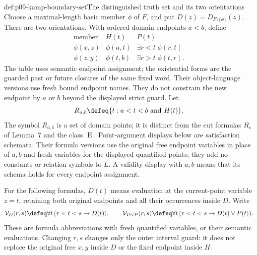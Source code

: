 \begin{hbdefinition}{def:p09-kamp-boundary-set}{The distinguished truth set and its two orientations}
Choose a maximal-length basic member \(\phi\) of \(F\), and
put \(D(z)=D_{F\setminus\{\phi\}}(z)\). There are two
orientations. With ordered domain endpoints \(a<b\), define
\[
\begin{array}{c|c|c}
 \text{member}&H(t)&P(t)\\ \hline
 \phi(x,z)&\phi(a,t)&\exists r<t\;\phi(r,t)\\
 \phi(z,y)&\phi(t,b)&\exists r>t\;\phi(t,r).
\end{array}
\]
The table uses semantic endpoint assignment; the existential forms are
the guarded past or future closures of the same fixed word. Their
object-language versions use fresh bound endpoint names. They do not
constrain the new endpoint by \(a\) or \(b\) beyond the displayed
strict guard. Let
\[
                   R_{a,b}\defeq\{t:a<t<b\text{ and }H(t)\}.
\]
The symbol \(R_{a,b}\) is a set of domain points; it is distinct
from the cut formulas \(R_c\) of Lemma~7 and the class
\(\operatorname{E}\).
Point-argument displays below are satisfaction schemata. Their formula
versions use the original free endpoint variables in place of \(a,b\)
and fresh variables for the displayed quantified points; they add no
constants or relation symbols to \(L\). A validity display with
\(a,b\) means that its schema holds for every endpoint assignment.

For the following formulas, \(D(t)\) means evaluation at the
current-point variable \(z=t\), retaining both original endpoints
and all their occurrences inside \(D\). Write
\[
 \mathcal V_D(r,s)\defeq\forall t\,(r<t<s\to D(t)),\qquad
 \mathcal V_{D\lor P}(r,s)\defeq
                         \forall t\,(r<t<s\to D(t)\lor P(t)).
\]
These are formula abbreviations with fresh quantified variables, or
their semantic evaluations. Changing \(r,s\) changes only the
outer interval guard: it does not replace the original free \(x,y\)
inside \(D\) or the fixed endpoint inside \(H\).
\end{hbdefinition}

